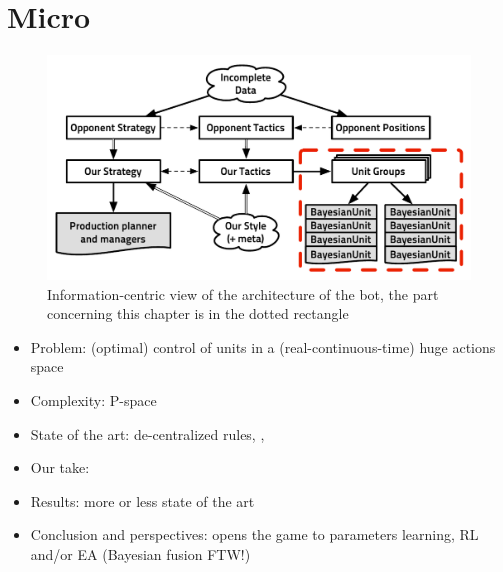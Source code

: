\chapter{Micro}
\begin{figure}[!ht]
\begin{center}
\includegraphics[width=13cm]{images/starcraft_bbq_concept_MICRO.pdf}
\end{center}
\label{fig:conceptMICRO}
\caption{Information-centric view of the architecture of the bot, the part concerning this chapter is in the dotted rectangle}
\end{figure}

\begin{itemize}
\item Problem: (optimal) control of units in a (real-continuous-time) huge actions space
\item Complexity: P-space
\item State of the art: de-centralized rules, \citep{Marthi05concurrenthierarchical}, \citep{WeberCIG10}
\item Our take: \citep{SYNNAEVE:Micro}
\item Results: more or less state of the art
\item Conclusion and perspectives: opens the game to parameters learning, RL and/or EA (Bayesian fusion FTW!)
\end{itemize}

